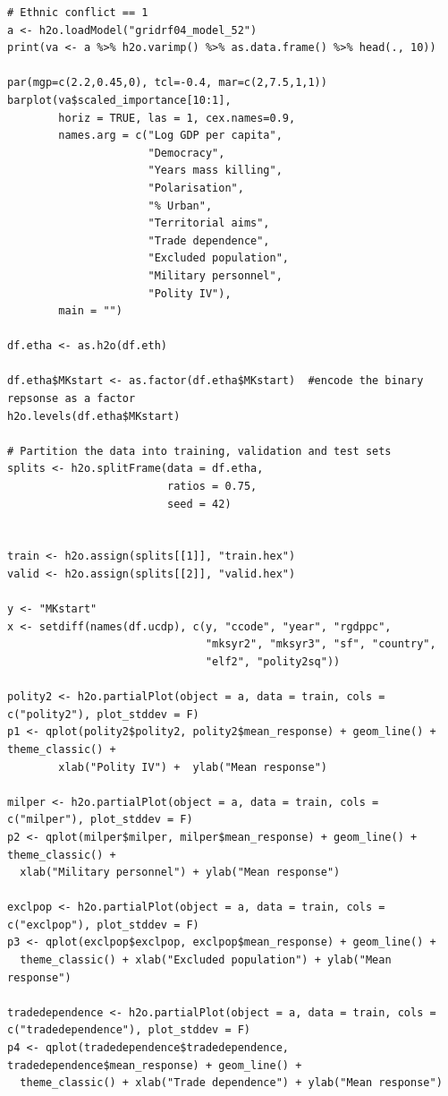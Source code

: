 \begin{verbatim}
# Ethnic conflict == 1
a <- h2o.loadModel("gridrf04_model_52")
print(va <- a %>% h2o.varimp() %>% as.data.frame() %>% head(., 10)) 

par(mgp=c(2.2,0.45,0), tcl=-0.4, mar=c(2,7.5,1,1))
barplot(va$scaled_importance[10:1],
        horiz = TRUE, las = 1, cex.names=0.9,
        names.arg = c("Log GDP per capita",
                      "Democracy",
                      "Years mass killing",
                      "Polarisation",
                      "% Urban",
                      "Territorial aims", 
                      "Trade dependence",
                      "Excluded population",
                      "Military personnel",
                      "Polity IV"),
        main = "")

df.etha <- as.h2o(df.eth)

df.etha$MKstart <- as.factor(df.etha$MKstart)  #encode the binary repsonse as a factor
h2o.levels(df.etha$MKstart)

# Partition the data into training, validation and test sets
splits <- h2o.splitFrame(data = df.etha, 
                         ratios = 0.75, 
                         seed = 42)  


train <- h2o.assign(splits[[1]], "train.hex")   
valid <- h2o.assign(splits[[2]], "valid.hex") 

y <- "MKstart"
x <- setdiff(names(df.ucdp), c(y, "ccode", "year", "rgdppc",
                               "mksyr2", "mksyr3", "sf", "country",
                               "elf2", "polity2sq")) 

polity2 <- h2o.partialPlot(object = a, data = train, cols = c("polity2"), plot_stddev = F)
p1 <- qplot(polity2$polity2, polity2$mean_response) + geom_line() + theme_classic() + 
        xlab("Polity IV") +  ylab("Mean response")

milper <- h2o.partialPlot(object = a, data = train, cols = c("milper"), plot_stddev = F)
p2 <- qplot(milper$milper, milper$mean_response) + geom_line() + theme_classic() +
  xlab("Military personnel") + ylab("Mean response")

exclpop <- h2o.partialPlot(object = a, data = train, cols = c("exclpop"), plot_stddev = F)
p3 <- qplot(exclpop$exclpop, exclpop$mean_response) + geom_line() +
  theme_classic() + xlab("Excluded population") + ylab("Mean response")

tradedependence <- h2o.partialPlot(object = a, data = train, cols = c("tradedependence"), plot_stddev = F)
p4 <- qplot(tradedependence$tradedependence, tradedependence$mean_response) + geom_line() +
  theme_classic() + xlab("Trade dependence") + ylab("Mean response")


\end{verbatim}
